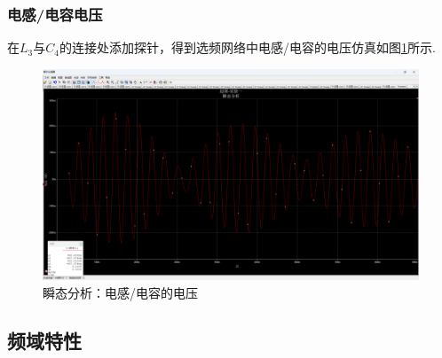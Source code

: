 \documentclass[UTF8]{ctexart}
\begin{document}
\subsubsection{电感/电容电压}
在$L_3$与$C_4$的连接处添加探针，得到选频网络中电感/电容的电压仿真如图\ref{img:multisim_transient_analysis}所示.
\begin{figure}[htbp]
    \centering
    \includegraphics[width=0.8\linewidth]{multisim_transient_analysis.png}
    \caption{瞬态分析：电感/电容的电压}
    \label{img:multisim_transient_analysis}
\end{figure}
\subsection{频域特性}
\end{document}
